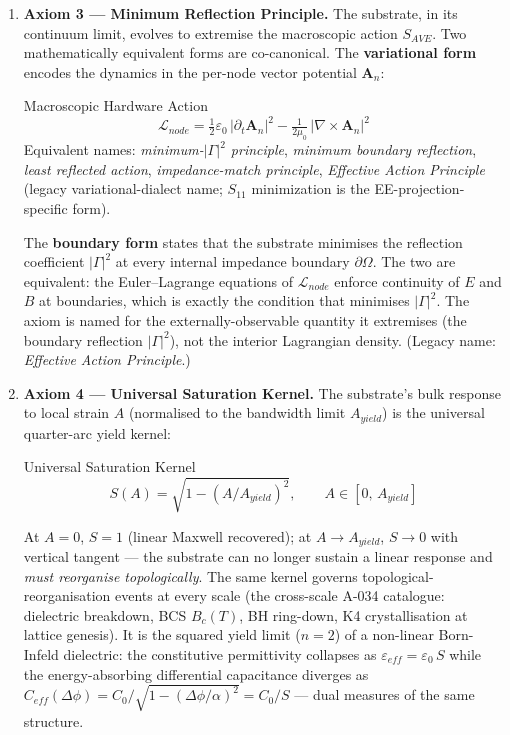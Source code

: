 \begin{enumerate}
    \item \textbf{Axiom 3 --- Minimum Reflection Principle.} The substrate, in its continuum limit, evolves to extremise the macroscopic action $S_{AVE}$. Two mathematically equivalent forms are co-canonical. The \textbf{variational form} encodes the dynamics in the per-node vector potential $\mathbf{A}_n$:
    \begin{resultbox}{Macroscopic Hardware Action}
    \begin{equation}
        \mathcal{L}_{node} = \tfrac{1}{2}\varepsilon_0\,|\partial_t \mathbf{A}_n|^2 - \tfrac{1}{2\mu_0}\,|\nabla \times \mathbf{A}_n|^2
    \end{equation}
    Equivalent names: \textit{minimum-$|\Gamma|^2$ principle}, \textit{minimum boundary reflection}, \textit{least reflected action}, \textit{impedance-match principle}, \textit{Effective Action Principle} (legacy variational-dialect name; $S_{11}$ minimization is the EE-projection-specific form).
    \end{resultbox}
    The \textbf{boundary form} states that the substrate minimises the reflection coefficient $|\Gamma|^2$ at every internal impedance boundary $\partial\Omega$. The two are equivalent: the Euler--Lagrange equations of $\mathcal{L}_{node}$ enforce continuity of $E$ and $B$ at boundaries, which is exactly the condition that minimises $|\Gamma|^2$. The axiom is named for the externally-observable quantity it extremises (the boundary reflection $|\Gamma|^2$), not the interior Lagrangian density. (Legacy name: \emph{Effective Action Principle}.)

    \item \textbf{Axiom 4 --- Universal Saturation Kernel.} The substrate's bulk response to local strain $A$ (normalised to the bandwidth limit $A_{yield}$) is the universal quarter-arc yield kernel:
    \begin{resultbox}{Universal Saturation Kernel}
    \begin{equation}
        S(A) = \sqrt{1 - (A/A_{yield})^2}, \qquad A \in [0,\,A_{yield}]
    \end{equation}
    \end{resultbox}
    At $A = 0$, $S = 1$ (linear Maxwell recovered); at $A \to A_{yield}$, $S \to 0$ with vertical tangent --- the substrate can no longer sustain a linear response and \emph{must reorganise topologically}. The same kernel governs topological-reorganisation events at every scale (the cross-scale A-034 catalogue: dielectric breakdown, BCS $B_c(T)$, BH ring-down, K4 crystallisation at lattice genesis). It is the squared yield limit ($n=2$) of a non-linear Born-Infeld dielectric: the constitutive permittivity collapses as $\varepsilon_{eff} = \varepsilon_0\,S$ while the energy-absorbing differential capacitance diverges as $C_{eff}(\Delta\phi) = C_0/\sqrt{1 - (\Delta\phi/\alpha)^2} = C_0/S$ --- dual measures of the same structure.
\end{enumerate}

